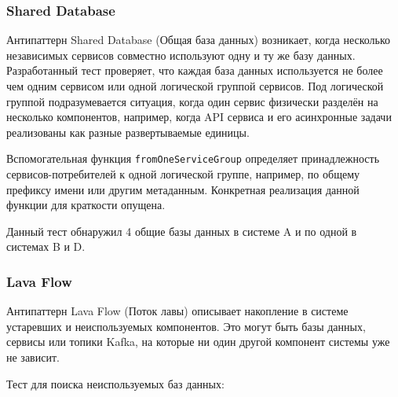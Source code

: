 \subsubsection{Shared Database}

Антипаттерн Shared Database (Общая база данных) возникает, когда несколько независимых сервисов совместно используют одну и ту же базу данных. Разработанный тест проверяет, что каждая база данных используется не более чем одним сервисом или одной логической группой сервисов. Под логической группой подразумевается ситуация, когда один сервис физически разделён на несколько компонентов, например, когда API сервиса и его асинхронные задачи реализованы как разные развертываемые единицы. 


Вспомогательная функция \verb|fromOneServiceGroup| определяет принадлежность сервисов-потребителей к одной логической группе, например, по общему префиксу имени или другим метаданным. Конкретная реализация данной функции для краткости опущена.

Данный тест обнаружил 4 общие базы данных в системе A и по одной в системах B и D.

\subsubsection{Lava Flow}

Антипаттерн Lava Flow (Поток лавы) описывает накопление в системе устаревших и неиспользуемых компонентов. Это могут быть базы данных, сервисы или топики Kafka, на которые ни один другой компонент системы уже не зависит. 

Тест для поиска неиспользуемых баз данных:


